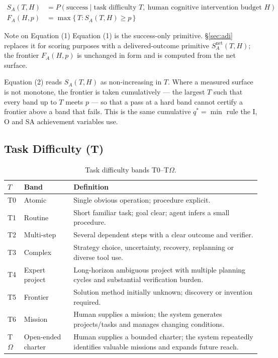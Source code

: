 \documentclass[11pt]{article}
\theoremstyle{definition}
\newcommand{\Om}{\ensuremath{\Omega}}
\newcommand{\SA}{\ensuremath{S_A(T,H)}}
\newcommand{\FA}{\ensuremath{F_A(H,p)}}
\begin{document}
\begin{align}
\SA{} &= P(\text{success} \mid \text{task difficulty } T,\ \text{human cognitive intervention budget } H)\\
\FA{} &= \max\{\,T : \SA{} \ge p\,\}
\end{align}

\begin{addedbox}{Note on Equation (1)}
Equation (1) is the success-only primitive. \S\ref{sec:adi} replaces it for scoring purposes with a delivered-outcome primitive $S^{\text{net}}_A(T,H)$; the frontier \FA{} is unchanged in form and is computed from the net surface.

Equation (2) reads \SA{} as non-increasing in $T$. Where a measured surface is not monotone, the frontier is taken cumulatively --- the largest $T$ such that every band up to $T$ meets $p$ --- so that a pass at a hard band cannot certify a frontier above a band that fails. This is the same cumulative $q^{*}=\min$ rule the I, O and SA achievement variables use.
\end{addedbox}

\subsection{Task Difficulty (T)}

\begin{table}[!htbp]
\centering\small
\begin{tabularx}{\textwidth}{@{}llY@{}}
\toprule
$T$ & Band & Definition \\
\midrule
T0 & Atomic & Single obvious operation; procedure explicit. \\
T1 & Routine & Short familiar task; goal clear; agent infers a small procedure. \\
T2 & Multi-step & Several dependent steps with a clear outcome and verifier. \\
T3 & Complex & Strategy choice, uncertainty, recovery, replanning or diverse tool use. \\
T4 & Expert project & Long-horizon ambiguous project with multiple planning cycles and substantial verification burden. \\
T5 & Frontier & Solution method initially unknown; discovery or invention required. \\
T6 & Mission & Human supplies a mission; the system generates projects/tasks and manages changing conditions. \\
T\Om{} & Open-ended charter & Human supplies a bounded charter; the system repeatedly identifies valuable missions and expands future reach. \\
\bottomrule
\end{tabularx}
\caption{Task difficulty bands T0--T\Om{}.}
\label{tab:t}
\end{table}
\end{document}
